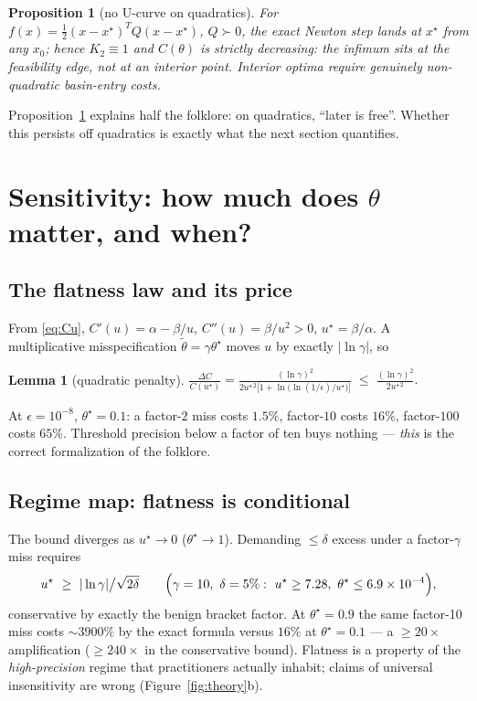 ﻿\documentclass[10pt]{article}
\newtheorem{lemma}{Lemma}
\newtheorem{proposition}{Proposition}
\begin{document}
\begin{proposition}[no U-curve on quadratics]\label{prop:quad}
For $f(x)=\tfrac12(x-x^\star)^{T}Q(x-x^\star)$, $Q\succ0$, the exact
Newton step lands at $x^\star$ from any $x_0$; hence $K_2\equiv1$ and
$C(\theta)$ is strictly \emph{decreasing}: the infimum sits at the
feasibility edge, not at an interior point. Interior optima require
genuinely non-quadratic basin-entry costs.
\end{proposition}

Proposition~\ref{prop:quad} explains half the folklore: on quadratics,
``later is free''. Whether this persists off quadratics is exactly what
the next section quantifies.

\section{Sensitivity: how much does $\theta$ matter, and when?}
\label{sec:sens}

\subsection{The flatness law and its price}
From \eqref{eq:Cu}, $C'(u)=\alpha-\beta/u$, $C''(u)=\beta/u^{2}>0$,
$u^\star=\beta/\alpha$. A multiplicative misspecification
$\tilde\theta=\gamma\theta^\star$ moves $u$ by exactly
$|\ln\gamma|$, so
\begin{lemma}[quadratic penalty]\label{lem:sens}
$\displaystyle
\frac{\Delta C}{C(u^\star)}
=\frac{(\ln\gamma)^2}{2u^{\star\,2}\bigl[1+\ln\!\bigl(\ln(1/\epsilon)/u^\star\bigr)\bigr]}
\;\le\;\frac{(\ln\gamma)^2}{2u^{\star\,2}} .$
\end{lemma}
At $\epsilon=10^{-8}$, $\theta^\star=0.1$: a factor-$2$ miss costs
$1.5\%$, factor-$10$ costs $16\%$, factor-$100$ costs $65\%$.
Threshold precision below a factor of ten buys nothing --- \emph{this}
is the correct formalization of the folklore.

\subsection{Regime map: flatness is conditional}\label{sec:regime}
The bound diverges as $u^\star\to0$ ($\theta^\star\to1$). Demanding
$\le\delta$ excess under a factor-$\gamma$ miss requires
\begin{equation}\label{eq:regime}
u^\star\ \ge\ |\ln\gamma|\big/\sqrt{2\delta}
\qquad\Bigl(\gamma=10,\ \delta=5\%:\ u^\star\ge7.28,\
\theta^\star\le6.9\times10^{-4}\Bigr),
\end{equation}
conservative by exactly the benign bracket factor. At
$\theta^\star=0.9$ the same factor-10 miss costs ${\sim}3900\%$ by the
exact formula versus $16\%$ at $\theta^\star=0.1$ --- a
${\ge}20\times$ amplification (${\ge}240\times$ in the conservative
bound). Flatness is a property of the \emph{high-precision} regime
that practitioners actually inhabit; claims of universal insensitivity
are wrong (Figure~\ref{fig:theory}b).
\end{document}
